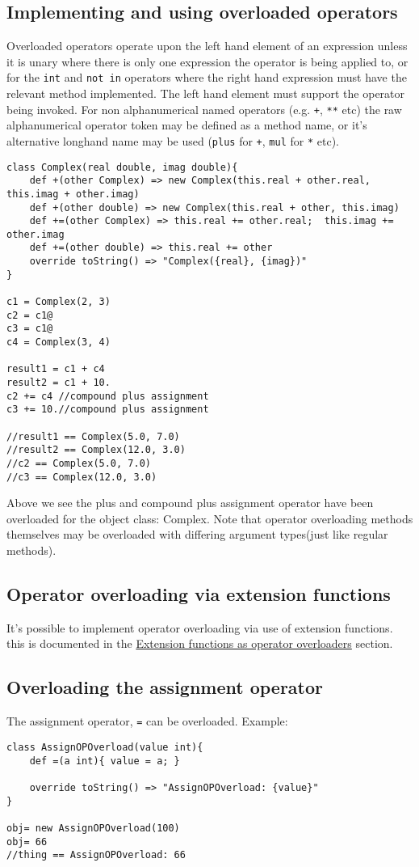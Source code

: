 \documentclass[conc-doc]{subfiles}
\begin{document}
\subsection{Implementing and using overloaded operators}
Overloaded operators operate upon the left hand element of an expression unless it is unary where there is only one expression the operator is being applied to, or for the \lstinline{int} and \lstinline{not in} operators where the right hand expression must have the relevant method implemented. The left hand element must support the operator being invoked. For non alphanumerical named operators (e.g. \lstinline{+}, \lstinline{**} etc) the raw alphanumerical operator token may be defined as a method name, or it's alternative longhand name may be used (\lstinline{plus} for \lstinline{+}, \lstinline{mul} for \lstinline{*} etc).

\begin{lstlisting}
class Complex(real double, imag double){
	def +(other Complex) => new Complex(this.real + other.real, this.imag + other.imag)
	def +(other double) => new Complex(this.real + other, this.imag)
	def +=(other Complex) => this.real += other.real;  this.imag += other.imag
	def +=(other double) => this.real += other
	override toString() => "Complex({real}, {imag})"
}

c1 = Complex(2, 3)
c2 = c1@
c3 = c1@
c4 = Complex(3, 4)

result1 = c1 + c4
result2 = c1 + 10.
c2 += c4 //compound plus assignment
c3 += 10.//compound plus assignment

//result1 == Complex(5.0, 7.0)
//result2 == Complex(12.0, 3.0)
//c2 == Complex(5.0, 7.0)
//c3 == Complex(12.0, 3.0)
\end{lstlisting}

Above we see the plus and compound plus assignment operator have been overloaded for the object class: Complex. Note that operator overloading methods themselves may be overloaded with differing argument types(just like regular methods).

\subsection{Operator overloading via extension functions}
It’s possible to implement operator overloading via use of extension functions. this is documented in the \hyperref[sec:extfunAsOpOver]{Extension functions as operator overloaders} section.

\subsection{Overloading the assignment operator}
\label{subsec:overloadassignmentop}
The assignment operator, \lstinline{=} can be overloaded. Example:
\begin{lstlisting}
class AssignOPOverload(value int){
	def =(a int){ value = a; }
	
	override toString() => "AssignOPOverload: {value}"
}

obj= new AssignOPOverload(100)
obj= 66
//thing == AssignOPOverload: 66
\end{lstlisting}
\end{document}
